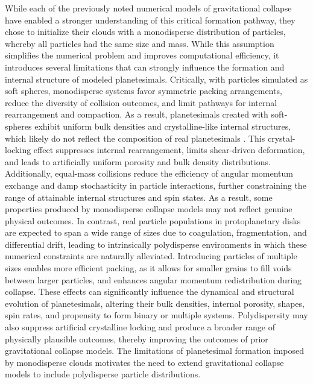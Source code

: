 \documentclass[fleqn,usenatbib]{mnras}
\begin{document}
While each of the previously noted numerical models of gravitational collapse have enabled a stronger understanding of this critical formation pathway, they chose to initialize their clouds with a monodisperse distribution of particles, whereby all particles had the same size and mass.
While this assumption simplifies the numerical problem and improves computational efficiency, it introduces several limitations that can strongly influence the formation and internal structure of modeled planetesimals.
Critically, with particles simulated as soft spheres, monodisperse systems favor symmetric packing arrangements, reduce the diversity of collision outcomes, and limit pathways for internal rearrangement and compaction. 
As a result, planetesimals created with soft-spheres exhibit uniform bulk densities and crystalline-like internal structures, which likely do not reflect the composition of real planetesimals \citep{Barnes2025}.
This crystal-locking effect suppresses internal rearrangement, limits shear-driven deformation, and leads to artificially uniform porosity and bulk density distributions.
Additionally, equal-mass collisions reduce the efficiency of angular momentum exchange and damp stochasticity in particle interactions, further constraining the range of attainable internal structures and spin states.
As a result, some properties produced by monodisperse collapse models may not reflect genuine physical outcomes. 
In contrast, real particle populations in protoplanetary disks are expected to span a wide range of sizes due to coagulation, fragmentation, and differential drift, leading to intrinsically polydisperse environments in which these numerical constraints are naturally alleviated.
Introducing particles of multiple sizes enables more efficient packing, as it allows for smaller grains to fill voids between larger particles, and enhances angular momentum redistribution during collapse.
These effects can significantly influence the dynamical and structural evolution of planetesimals, altering their bulk densities, internal porosity, shapes, spin rates, and propensity to form binary or multiple systems.
Polydispersity may also suppress artificial crystalline locking and produce a broader range of physically plausible outcomes, thereby improving the outcomes of prior gravitational collapse models.
The limitations of planetesimal formation imposed by monodisperse clouds motivates the need to extend gravitational collapse models to include polydisperse particle distributions. 
\end{document}
